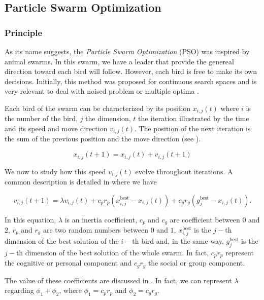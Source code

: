 \documentclass[12pt, openany]{article}
\begin{document}
\subsection{Particle Swarm Optimization}\label{sec:PSO_theory}

\subsubsection{Principle}

As its name suggests, the \emph{Particle Swarm Optimization} (PSO) was inspired by animal swarms. In this swarm, we have a leader that provide the genereal direction toward each bird will follow. However, each bird is free to make its own decisions. Initially, this method was proposed for continuous search spaces and is very relevant to deal with noised problem or multiple optima \cite{kennedy1995particle}.

Each bird of the swarm can be characterized by its position $x_{i,j}(t)$ where $i$ is the number of the bird, $j$ the dimension, $t$ the iteration illustrated by the time and its speed and move direction $v_{i,j}(t)$. The position of the next iteration is the sum of the previous position and the move direction (see \cite{przewozniczek_pso}).

\begin{equation}\label{eq:position_pso}
    x_{i,j}(t+1)=x_{i,j}(t) + v_{i,j}(t+1)
\end{equation}

We now to study how this speed $v_{i,j}(t)$ evolve throughout iterations. A common description is detailed in \cite{vandenbergh2006study} where we have

\begin{equation}\label{eq:velocity_pso}
    v_{i,j}(t+1) = \lambda v_{i,j}(t) + c_pr_p \left(x_{i,j}^{\text{best}} - x_{i,j}(t)\right) + c_g r_g \left(g_{j}^{\text{best}} - x_{i,j}(t)\right).
\end{equation}

In this equation, $\lambda$ is an inertia coefficient, $c_p$ and $c_g$ are coefficient between $0$ and $2$, $r_p$ and $r_g$ are two random numbers between $0$ and $1$, $x_{i,j}^{\text{best}}$ is the $j-$th dimension of the best solution of the $i-$th bird and, in the same way, $g_{j}^{\text{best}}$ is the $j-$th dimension of the best solution of the whole swarm. In fact, $c_pr_p$ represent the cognitive or personal component and $c_g r_g$ the social or group component.

The value of these coefficients are discussed in \cite{vandenbergh2006study}. In fact, we can represent $\lambda$ regarding $\phi_1+\phi_2$, where $\phi_1=c_p r_p$ and $\phi_2=c_g r_g$.
\end{document}

